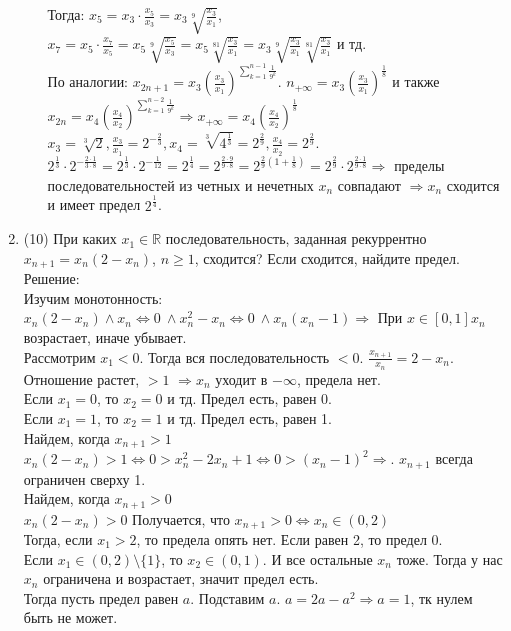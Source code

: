 \documentclass[a4paper]{article}
\begin{document}
\begin{enumerate}
\begin{enumerate}
        Тогда: $x_5=x_3\cdot \frac{x_5}{x_3} = x_3 \sqrt[9]{\frac{x_3}{x_1}}$, $x_7=x_5\cdot \frac{x_7}{x_5} = x_5 \sqrt[9]{\frac{x_5}{x_3}} = x_5 \sqrt[81]{\frac{x_3}{x_1}} = x_3 \sqrt[9]{\frac{x_3}{x_1}}\sqrt[81]{\frac{x_3}{x_1}}$ и тд.\\
        По аналогии: $x_{2n+1} = x_3(\frac{x_3}{x_1})^{\sum_{k=1}^{n-1} \frac{1}{9^k}}$. $n_{+\infty} = x_3(\frac{x_3}{x_1})^\frac{1}{8}$ и также $x_{2n} = x_4(\frac{x_4}{x_2})^{\sum_{k=1}^{n-2}\frac{1}{9^k}} \Rightarrow x_{+\infty} = x_4(\frac{x_4}{x_2})^{\frac{1}{8}}$\\
        $x_3 = \sqrt[3]{2}, \frac{x_3}{x_1} = 2^{-\frac{2}{3}}, x_4 = \sqrt[3]{4^{\frac{1}{3}}} = 2^{\frac{2}{9}}, \frac{x_4}{x_2} = 2^{\frac{2}{9}}.$\\
        $2^{\frac{1}{3}}\cdot 2^{-\frac{2\cdot 1}{3\cdot 8}} = 2^{\frac{1}{3}}\cdot 2^{-\frac{1}{12}} = 2^{\frac{1}{4}} = 2^{\frac{2\cdot 9}{9\cdot 8}} = 2^{\frac{2}{9}(1 + \frac{1}{8})} = 2^\frac{2}{9}\cdot 2^{\frac{2\cdot 1}{9\cdot 8}} \Rightarrow$ пределы последовательностей из четных и нечетных $x_n$ совпадают $\Rightarrow x_n$ сходится и имеет предел $2^\frac{1}{4}$. 
    \end{enumerate}
    
    \item (10) При каких $x_1\in\mathbb{R}$ последовательность, заданная рекуррентно $x_{n+1}=x_n(2-x_n)$, $n\geqslant1$, сходится? Если сходится, найдите предел.\\
    Решение:\\
    Изучим монотонность:\\
    $x_n(2 - x_n) \wedge x_n \Leftrightarrow 0\ \wedge x_n^2 - x_n \Leftrightarrow 0\ \wedge x_n(x_n - 1) \Rightarrow$ При $x \in [0, 1] x_n$ возрастает, иначе убывает.\\
    Рассмотрим $x_1 < 0$. Тогда вся последовательность $< 0$. $\frac{x_{n+1}}{x_n} = 2 - x_n$. Отношение растет, $> 1$ $\Rightarrow x_n$ уходит в $-\infty$, предела нет.\\
    Если $x_1 = 0$, то $x_2 = 0$ и тд. Предел есть, равен 0.\\
    Если $x_1 = 1$, то $x_2 = 1$ и тд. Предел есть, равен 1.\\
    Найдем, когда $x_{n+1} > 1$\\
    $x_n(2-x_n) > 1 \Leftrightarrow 0 > x_n^2 - 2x_n + 1 \Leftrightarrow 0 > (x_n - 1)^2 \Rightarrow$. $x_{n+1}$ всегда ограничен сверху 1.\\
    Найдем, когда $x_{n+1} > 0$\\
    $x_n(2-x_n) > 0$ Получается, что $x_{n+1} > 0 \Leftrightarrow x_n \in (0, 2)$\\
    Тогда, если $x_1 > 2$, то предела опять нет. Если равен 2, то предел 0.\\
    Если $x_1 \in (0, 2)\!\setminus\{1\}$, то $x_2 \in (0, 1)$. И все остальные $x_n$ тоже. Тогда у нас $x_n$ ограничена и возрастает, значит предел есть.\\
    Тогда пусть предел равен $a$. Подставим $a$. $a = 2a - a^2 \Rightarrow a = 1$, тк нулем быть не может.

\end{enumerate}
\end{document}
